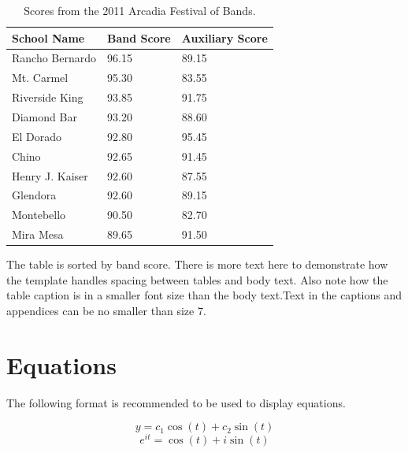 \begin{table}[h!]
	\centering

	\label{Band}
	\begin{tabular}{|l|l|l|}
		\hline
		School Name     & Band Score & Auxiliary Score \\ \hline
		Rancho Bernardo & 96.15      & 89.15           \\ \hline
		Mt. Carmel      & 95.30      & 83.55           \\ \hline
		Riverside King  & 93.85      & 91.75           \\ \hline
		Diamond Bar     & 93.20      & 88.60           \\ \hline
		El Dorado       & 92.80      & 95.45           \\ \hline
		Chino           & 92.65      & 91.45           \\ \hline
		Henry J. Kaiser & 92.60      & 87.55           \\ \hline
		Glendora        & 92.60      & 89.15           \\ \hline
		Montebello      & 90.50      & 82.70           \\ \hline
		Mira Mesa       & 89.65      & 91.50           \\ \hline
	\end{tabular}
	\caption{Scores from the 2011 Arcadia Festival of Bands.}
\end{table}

The table is sorted by band score. There is more text here to demonstrate how the template handles spacing between tables and body text. Also note how the table caption is in a smaller font size than the body text.Text in the captions and appendices can be no smaller than size 7.

\section{Equations}

The following format is recommended to be used to display equations.

\begin{equation} \label{Equ.2.1}
	y=c_1\cos(t)+c_2\sin(t)
\end{equation}
\begin{equation} \label{Equ.2.2}
	e^{it}=\cos(t)+i\sin(t)
\end{equation}

